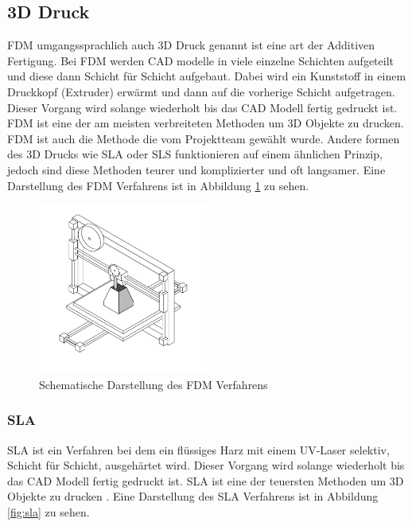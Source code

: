 \subsection{3D Druck}
\label{sec:3d_druck}

\ac{FDM} umgangssprachlich auch 3D Druck genannt ist eine art der Additiven Fertigung. Bei \ac{FDM} werden \ac{CAD} modelle in viele einzelne Schichten aufgeteilt und diese dann Schicht für Schicht aufgebaut. Dabei wird ein Kunststoff in einem Druckkopf (Extruder) erwärmt und dann auf die vorherige Schicht aufgetragen. Dieser Vorgang wird solange wiederholt bis das \ac{CAD} Modell fertig gedruckt ist. \ac{FDM} ist eine der am meisten verbreiteten Methoden um 3D Objekte zu drucken. \ac{FDM} ist auch die Methode die vom Projektteam gewählt wurde. Andere formen des 3D Drucks wie \ac{SLA} oder \ac{SLS} funktionieren auf einem ähnlichen Prinzip, jedoch sind diese Methoden teurer und komplizierter und oft langsamer. Eine Darstellung des \ac{FDM} Verfahrens ist in Abbildung \ref{fig:fdm} zu sehen.

\begin{figure}[H]
    \centering
    \includegraphics[width=0.5\textwidth]{images/fdm.png}
    \caption{Schematische Darstellung des \ac{FDM} Verfahrens }
    \label{fig:fdm}
\end{figure}

\subsubsection{\ac{SLA}}

\ac{SLA} ist ein Verfahren bei dem ein flüssiges Harz mit einem UV-Laser selektiv, Schicht für Schicht, ausgehärtet wird. Dieser Vorgang wird solange wiederholt bis das \ac{CAD} Modell fertig gedruckt ist. \ac{SLA} ist eine der teuersten Methoden um 3D Objekte zu drucken . Eine Darstellung des \ac{SLA} Verfahrens ist in Abbildung \ref{fig:sla} zu sehen.

